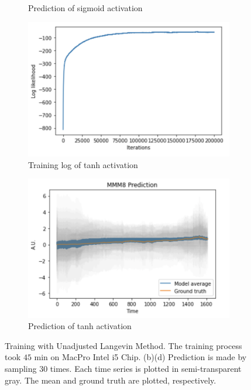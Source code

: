 \documentclass{article}
\begin{document}
\begin{figure}[H]
\begin{subfigure}[b]{0.5\textwidth}
        \caption{Prediction of sigmoid activation}
        \label{fig:prediction-sigmoid}
    \end{subfigure}
    \begin{subfigure}[b]{0.5\textwidth}
        \centering
        \includegraphics[width=\textwidth]{../img/training_Langevin_200000_tanh.png}
        \caption{Training log of tanh activation}
    \end{subfigure}\hfill
    \begin{subfigure}[b]{0.5\textwidth}
        \centering
        \includegraphics[trim={0 0 0 0.7cm}, clip, width=\textwidth]{../img/prediction_Langevin_200000_tanh.png}
        \caption{Prediction of tanh activation}
        \label{fig:prediction-tanh}
    \end{subfigure}
    \caption{Training with Unadjusted Langevin Method\citep{durmus2019high}. The training process took $45$ min on MacPro Intel i5 Chip. (b)(d) Prediction is made by sampling $30$ times. Each time series is plotted in semi-transparent gray. The mean and ground truth are plotted, respectively.}
\end{figure}
\end{document}
